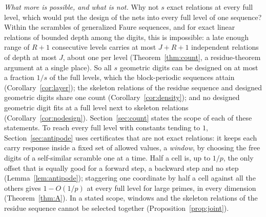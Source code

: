 \emph{What more is possible, and what is not.} Why not $s$ exact relations at every full level, which would put the design of the nets into every full level of one sequence? Within the scrambles of generalized Faure sequences, and for exact linear relations of bounded depth among the digits, this is impossible: a late enough range of $R+1$ consecutive levels carries at most $J+R+1$ independent relations of depth at most $J$, about one per level (Theorem~\ref{thm:count}, a residue-theorem argument at a single place). So all $s$ geometric digits can be designed on at most a fraction $1/s$ of the full levels, which the block-periodic sequences attain (Corollary~\ref{cor:layer}); the skeleton relations of the residue sequence and designed geometric digits share one count (Corollary~\ref{cor:density}); and no designed geometric digit fits at a full level next to skeleton relations (Corollary~\ref{cor:nodesign}). Section~\ref{sec:count} states the scope of each of these statements. To reach every full level with constants tending to $1$, Section~\ref{sec:antipode} uses certificates that are not exact relations: it keeps each carry response inside a fixed set of allowed values, a \emph{window}, by choosing the free digits of a self-similar scramble one at a time. Half a cell is, up to $1/p$, the only offset that is equally good for a forward step, a backward step and no step (Lemma~\ref{lem:antipode}); staggering one coordinate by half a cell against all the others gives $1-O(1/p)$ at every full level for large primes, in every dimension (Theorem~\ref{thm:A}). In a stated scope, windows and the skeleton relations of the residue sequence cannot be selected together (Proposition~\ref{prop:joint}).

